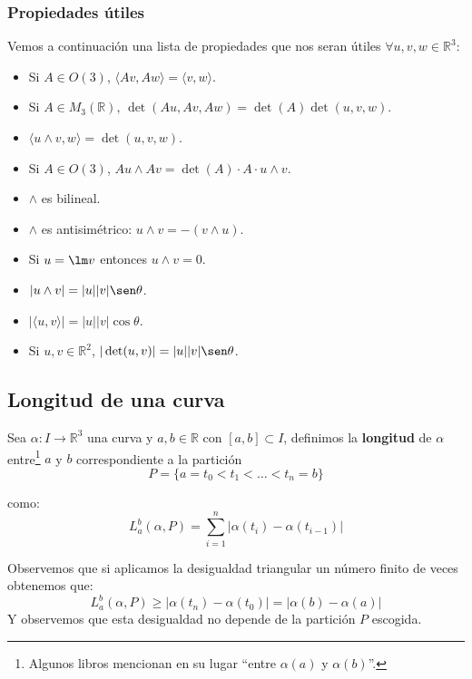 \subsubsection{Propiedades útiles}
\noindent
Vemos a continuación una lista de propiedades que nos seran útiles $\forall u,v,w\in \mathbb{R}^3$:
\begin{itemize}
    \item Si $A\in O(3)$, $\langle Av,Aw \rangle =\langle v,w \rangle $.
    \item Si $A\in M_3(\mathbb{R})$, $\det(Au,Av,Aw) = \det(A)\det(u,v,w)$.
    \item $\langle u\land v,w \rangle =\det(u,v,w)$.
    \item Si $A\in O(3)$, $Au\land Av = \det(A)\cdot A\cdot u\land v$.
    \item $\land$ es bilineal.
    \item $\land$ es antisimétrico: $u\land v = -(v\land u)$.
    \item Si $u = \lm v$ entonces $u\land v = 0$.
    \item $|u\land v| = |u||v|\sen\theta$.
    \item $|\langle u,v \rangle | = |u||v|\cos\theta$.
    \item Si $u,v\in \mathbb{R}^2$, $|\det(u,v)| = |u||v|\sen\theta$.
\end{itemize}

\subsection{Longitud de una curva}
\begin{definicion}
    Sea $\alpha:I\to \mathbb{R}^3$ una curva y $a,b\in \mathbb{R}$ con $[a,b]\subset I$, definimos la \textbf{longitud} de $\alpha$ entre\footnote{Algunos libros mencionan en su lugar ``entre $\alpha(a)$ y $\alpha(b)$''.} $a$ y $b$ correspondiente a la partición 
    \begin{equation*}
        P = \{a = t_0 < t_1  < \ldots < t_n = b\}
    \end{equation*}

    como:
    \begin{equation*}
        L_a^b(\alpha, P) = \sum_{i=1}^{n} |\alpha(t_i) - \alpha(t_{i-1})|
    \end{equation*}
\end{definicion}

\noindent
Observemos que si aplicamos la desigualdad triangular un número finito de veces obtenemos que:
\begin{equation*}
    L_a^b(\alpha, P) \geq |\alpha(t_n) - \alpha(t_0)| = |\alpha(b) - \alpha(a)|
\end{equation*}
Y observemos que esta desigualdad no depende de la partición $P$ escogida.


